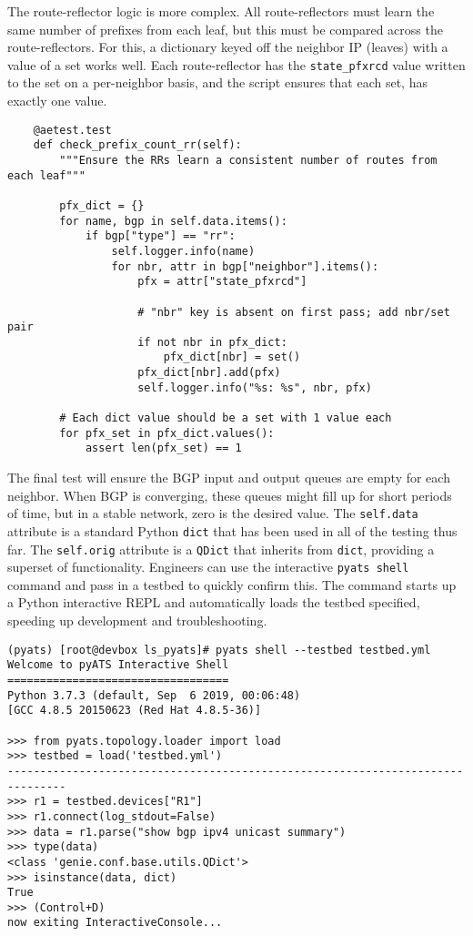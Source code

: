 The route-reflector logic is more complex. All route-reflectors must learn the
same number of prefixes from each leaf, but this must be compared across the
route-reflectors. For this, a dictionary keyed off the neighbor IP (leaves)
with a value of a set works well. Each route-reflector has the
\verb|state_pfxrcd| value written to the set on a per-neighbor basis, and
the script ensures that each set, has exactly one value.

\begin{verbatim}
    @aetest.test
    def check_prefix_count_rr(self):
        """Ensure the RRs learn a consistent number of routes from each leaf"""

        pfx_dict = {}
        for name, bgp in self.data.items():
            if bgp["type"] == "rr":
                self.logger.info(name)
                for nbr, attr in bgp["neighbor"].items():
                    pfx = attr["state_pfxrcd"]

                    # "nbr" key is absent on first pass; add nbr/set pair
                    if not nbr in pfx_dict:
                        pfx_dict[nbr] = set()
                    pfx_dict[nbr].add(pfx)
                    self.logger.info("%s: %s", nbr, pfx)

        # Each dict value should be a set with 1 value each
        for pfx_set in pfx_dict.values():
            assert len(pfx_set) == 1
\end{verbatim}

The final test will ensure the BGP input and output queues are empty
for each neighbor. When BGP is converging, these queues might fill up
for short periods of time, but in a stable network, zero is the desired
value. The \verb|self.data| attribute is a standard Python \verb|dict| that
has been used in all of the testing thus far. The \verb|self.orig| attribute
is a \verb|QDict| that inherits from \verb|dict|, providing a superset of
functionality. Engineers can use the interactive \verb|pyats shell| command
and pass in a testbed to quickly confirm this. The command starts up a
Python interactive REPL and automatically loads the testbed specified,
speeding up development and troubleshooting.

\begin{verbatim}
(pyats) [root@devbox ls_pyats]# pyats shell --testbed testbed.yml
Welcome to pyATS Interactive Shell
==================================
Python 3.7.3 (default, Sep  6 2019, 00:06:48)
[GCC 4.8.5 20150623 (Red Hat 4.8.5-36)]

>>> from pyats.topology.loader import load
>>> testbed = load('testbed.yml')
-------------------------------------------------------------------------------
>>> r1 = testbed.devices["R1"]
>>> r1.connect(log_stdout=False)
>>> data = r1.parse("show bgp ipv4 unicast summary")
>>> type(data)
<class 'genie.conf.base.utils.QDict'>
>>> isinstance(data, dict)
True
>>> (Control+D)
now exiting InteractiveConsole...
\end{verbatim}

